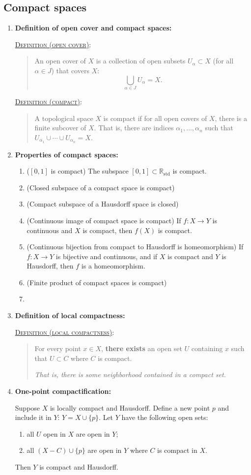 \documentclass[letterpaper, 12pt]{article}
\newcommand{\RR}{\mathbb{R}}
\newcommand{\defn}[2]{\textsc{\underline{Definition (#1)}:}\begin{quote} #2\end{quote}}
\begin{document}
    \subsection{Compact spaces}
        \begin{enumerate}
        \item \textbf{Definition of open cover and compact spaces:}

        \defn{open cover}{An open cover of $X$ is a collection of open subsets $U_\alpha\subset X$ (for all $\alpha\in J$) that covers $X$: \[\bigcup_{\alpha\in J} U_\alpha = X.\]}

        \defn{compact}{A topological space $X$ is compact if for all open covers of $X$, there is a finite subcover of $X$. That is, there are indices $\alpha_1, \dots, \alpha_n$ such that $U_{\alpha_1}\cup\cdots\cup U_{\alpha_n} = X$.}
        \item \textbf{Properties of compact spaces:}
        \begin{enumerate}
            \item ($[0,1]$ is compact) The subspace $[0,1]\subset \RR_\text{std}$ is compact.
            \item (Closed subspace of a compact space is compact)
            \item (Compact subspace of a Hausdorff space is closed)
            \item (Continuous image of compact space is compact) If $f:X\to Y$ is continuous and $X$ is compact, then $f(X)$ is compact.
            \item (Continuous bijection from compact to Hausdorff is homeomorphism) If $f:X\to Y$ is bijective and continuous, and if $X$ is compact and $Y$ is Hausdorff, then $f$ is a homeomorphism.
            \item (Finite product of compact spaces is compact)
            \item 
        \end{enumerate}
        \item \textbf{Definition of local compactness:}

        \defn{local compactness}{For every point $x\in X$, \textbf{there exists} an open set $U$ containing $x$ such that $U\subset C$ where $C$ is compact.

        \textit{That is, there is some neighborhood contained in a compact set.}}
        \item \textbf{One-point compactification:}

        Suppose $X$ is locally compact and Hausdorff. Define a new point $p$ and include it in $Y$: $Y = X\cup \{p\}$. Let $Y$ have the following open sets:
        \begin{enumerate}
            \item all $U$ open in $X$ are open in $Y$;
            \item all $(X-C)\cup\{p\}$ are open in $Y$ where $C$ is compact in $X$.
        \end{enumerate}
        Then $Y$ is compact and Hausdorff.
        \end{enumerate}
\end{document}
